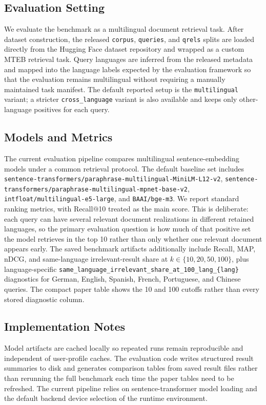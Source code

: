 \subsection{Evaluation Setting}

We evaluate the benchmark as a multilingual document retrieval task. After dataset construction, the released \texttt{corpus}, \texttt{queries}, and \texttt{qrels} splits are loaded directly from the Hugging Face dataset repository and wrapped as a custom MTEB retrieval task. Query languages are inferred from the released metadata and mapped into the language labels expected by the evaluation framework so that the evaluation remains multilingual without requiring a manually maintained task manifest. The default reported setup is the \texttt{multilingual} variant; a stricter \texttt{cross\_language} variant is also available and keeps only other-language positives for each query.

\subsection{Models and Metrics}

The current evaluation pipeline compares multilingual sentence-embedding models under a common retrieval protocol. The default baseline set includes \texttt{sentence-transformers/paraphrase-multilingual-MiniLM-L12-v2}, \texttt{sentence-transformers/paraphrase-multilingual-mpnet-base-v2}, \texttt{intfloat/multilingual-e5-large}, and \texttt{BAAI/bge-m3}. We report standard ranking metrics, with Recall@10 treated as the main score. This is deliberate: each query can have several relevant document realizations in different retained languages, so the primary evaluation question is how much of that positive set the model retrieves in the top 10 rather than only whether one relevant document appears early. The saved benchmark artifacts additionally include Recall, MAP, nDCG, and same-language irrelevant-result share at \(k \in \{10,20,50,100\}\), plus language-specific \texttt{same\_language\_irrelevant\_share\_at\_100\_lang\_\{lang\}} diagnostics for German, English, Spanish, French, Portuguese, and Chinese queries. The compact paper table shows the 10 and 100 cutoffs rather than every stored diagnostic column.

\subsection{Implementation Notes}

Model artifacts are cached locally so repeated runs remain reproducible and independent of user-profile caches. The evaluation code writes structured result summaries to disk and generates comparison tables from saved result files rather than rerunning the full benchmark each time the paper tables need to be refreshed. The current pipeline relies on sentence-transformer model loading and the default backend device selection of the runtime environment.

